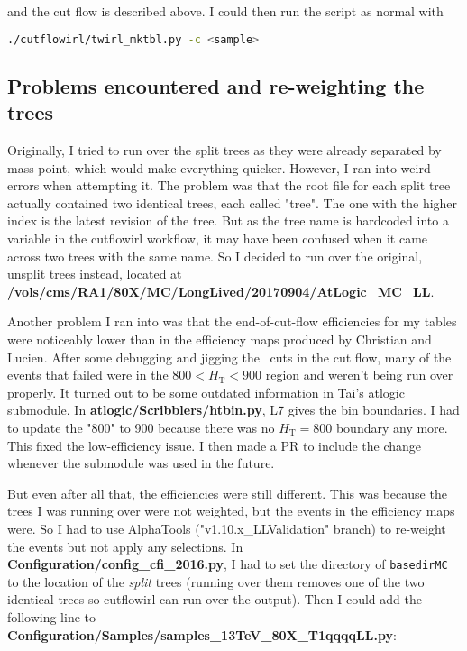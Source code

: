 and the cut flow is described above. I could then run the script as normal with

\begin{lstlisting}[belowskip=-0.7cm, language=sh, numbers=none]
./cutflowirl/twirl_mktbl.py -c <sample>
\end{lstlisting}


\subsection{Problems encountered and re-weighting the trees}

Originally, I tried to run over the split trees as they were already separated by mass point, which would make everything quicker. However, I ran into weird errors when attempting it. The problem was that the root file for each split tree actually contained two identical trees, each called "tree". The one with the higher index is the latest revision of the tree. But as the tree name is hardcoded into a variable in the cutflowirl workflow, it may have been confused when it came across two trees with the same name. So I decided to run over the original, unsplit trees instead, located at \textbf{/vols/cms/RA1/80X/MC/LongLived/20170904/AtLogic\_MC\_LL}.

Another problem I ran into was that the end-of-cut-flow efficiencies for my tables were noticeably lower than in the efficiency maps produced by Christian and Lucien. After some debugging and jigging the \alphat\ cuts in the cut flow, many of the events that failed were in the $800 < H_{\mathrm{T}} < 900$ region and weren't being run over properly. It turned out to be some outdated information in Tai's atlogic submodule. In \textbf{atlogic/Scribblers/htbin.py}, L7 gives the bin boundaries. I had to update the "800" to 900 because there was no $H_{\mathrm{T}} = 800$ boundary any more. This fixed the low-efficiency issue. I then made a PR to include the change whenever the submodule was used in the future.

But even after all that, the efficiencies were still different. This was because the trees I was running over were not weighted, but the events in the efficiency maps were. So I had to use AlphaTools ("v1.10.x\_LLValidation" branch) to re-weight the events but not apply any selections. In \textbf{Configuration/config\_cfi\_2016.py}, I had to set the directory of \texttt{basedirMC} to the location of the \emph{split} trees (running over them removes one of the two identical trees so cutflowirl can run over the output). Then I could add the following line to \textbf{Configuration/Samples/samples\_13TeV\_80X\_T1qqqqLL.py}:

